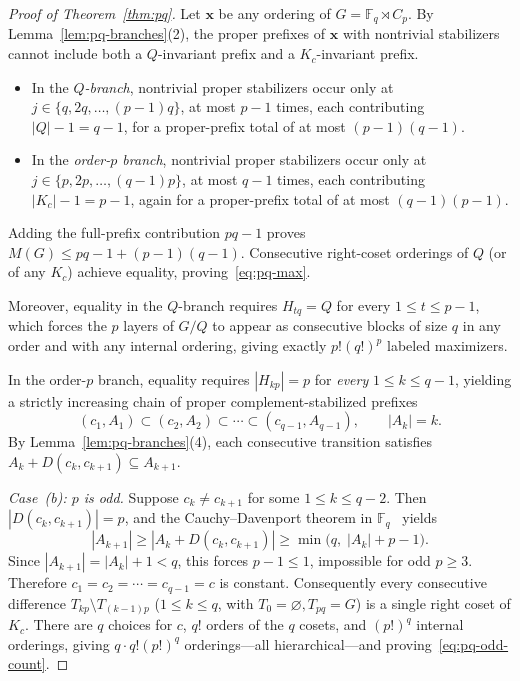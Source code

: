 \documentclass[11pt,reqno]{amsart}
\numberwithin{equation}{section}
\theoremstyle{definition}
\theoremstyle{remark}
\newcommand{\F}{\mathbb{F}}
\begin{document}
\begin{proof}[Proof of Theorem~\ref{thm:pq}]
Let $\mathbf{x}$ be any ordering of $G=\F_q\rtimes C_p$. By Lemma~\ref{lem:pq-branches}(2), the proper prefixes of $\mathbf{x}$ with nontrivial stabilizers cannot include both a $Q$-invariant prefix and a $K_c$-invariant prefix.
\begin{itemize}[leftmargin=1.5em]
\item In the \emph{$Q$-branch}, nontrivial proper stabilizers occur only at $j\in\{q,2q,\ldots,(p-1)q\}$, at most $p-1$ times, each contributing $|Q|-1=q-1$, for a proper-prefix total of at most $(p-1)(q-1)$.
\item In the \emph{order-$p$ branch}, nontrivial proper stabilizers occur only at $j\in\{p,2p,\ldots,(q-1)p\}$, at most $q-1$ times, each contributing $|K_c|-1=p-1$, again for a proper-prefix total of at most $(q-1)(p-1)$.
\end{itemize}
Adding the full-prefix contribution $pq-1$ proves $M(G)\le pq-1+(p-1)(q-1)$. Consecutive right-coset orderings of $Q$ (or of any $K_c$) achieve equality, proving~\eqref{eq:pq-max}.

Moreover, equality in the $Q$-branch requires $H_{tq}=Q$ for every $1\le t\le p-1$, which forces the $p$ layers of $G/Q$ to appear as consecutive blocks of size $q$ in any order and with any internal ordering, giving exactly $p!(q!)^p$ labeled maximizers.

In the order-$p$ branch, equality requires $|H_{kp}|=p$ for \emph{every} $1\le k\le q-1$, yielding a strictly increasing chain of proper complement-stabilized prefixes
\[
(c_1,A_1) \subset (c_2,A_2) \subset \cdots \subset (c_{q-1},A_{q-1}),\qquad |A_k|=k.
\]
By Lemma~\ref{lem:pq-branches}(4), each consecutive transition satisfies $A_k + D(c_k,c_{k+1})\subseteq A_{k+1}$.

\smallskip
\noindent\emph{Case~(b): $p$ is odd.} Suppose $c_k\neq c_{k+1}$ for some $1\le k\le q-2$. Then $|D(c_k,c_{k+1})|=p$, and the Cauchy--Davenport theorem in $\F_q$~\cite{Nat96} yields
\[
|A_{k+1}| \ge |A_k + D(c_k,c_{k+1})| \ge \min\bigl(q,\; |A_k| + p - 1\bigr).
\]
Since $|A_{k+1}|=|A_k|+1<q$, this forces $p-1\le 1$, impossible for odd $p\ge 3$. Therefore $c_1=c_2=\cdots=c_{q-1}=c$ is constant. Consequently every consecutive difference $T_{kp}\setminus T_{(k-1)p}$ ($1\le k\le q$, with $T_0=\varnothing, T_{pq}=G$) is a single right coset of $K_c$. There are $q$ choices for $c$, $q!$ orders of the $q$ cosets, and $(p!)^q$ internal orderings, giving $q\cdot q!(p!)^q$ orderings---all hierarchical---and proving~\eqref{eq:pq-odd-count}.


\end{proof}
\end{document}
